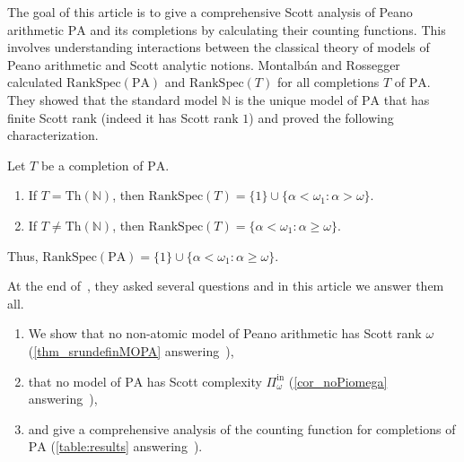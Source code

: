 \documentclass[11pt]{amsart}
\newcommand{\Pinf}[1]{\Pi^{\mathrm{in}}_{#1}}
\newcommand{\PA}{\mathrm{PA}}
\newcommand{\Th}{\mathrm{Th}}
\newcommand{\SSprank}{\mathrm{RankSpec}}
\theoremstyle{remark}
\begin{document}
The goal of this article is to give a comprehensive Scott analysis of Peano arithmetic $\PA$ and its completions by calculating their counting functions.
This involves understanding interactions between the classical theory of models of Peano arithmetic and Scott analytic notions.
Montalbán and Rossegger~\cite{MR23} calculated $\SSprank(\PA)$ and $\SSprank(T)$ for all completions $T$ of $\PA$. They showed that the standard model $\mathbb N$ is the unique model of $\PA$ that has finite Scott rank (indeed it has Scott rank $1$) and proved the following characterization.
\begin{theorem}[\cite{MR23}]\label{thm:monross}
    Let $T$ be a completion of $\PA$.
		\begin{enumerate}
			\item If $T=\Th(\mathbb N)$, then $\SSprank(T)=\{1\}\cup \{\alpha<\omega_1: \alpha>\omega\}$.
			\item If $T\neq\Th(\mathbb N)$, then $\SSprank(T)=\{\alpha<\omega_1: \alpha\geq\omega\}$.
		\end{enumerate}
		Thus, $\SSprank(\PA)=\{1\}\cup\{ \alpha<\omega_1: \alpha\geq \omega\}$.
\end{theorem}
At the end of~\cite{MR23}, they asked several questions and in this article we answer them all. 
\begin{enumerate}
	\item We show that no non-atomic model of Peano arithmetic has Scott rank $\omega$ (\cref{thm_srundefinMOPA} answering~\cite[Question 1]{MR23}),
	\item that no model of $\PA$ has Scott complexity $\Pinf{\omega}$ (\cref{cor_noPiomega} answering~\cite[Question 3]{MR23}),
	\item and give a comprehensive analysis of the counting function for completions of $\PA$ (\cref{table:results} answering~\cite[Question 2]{MR23}).
\end{enumerate}
\end{document}
